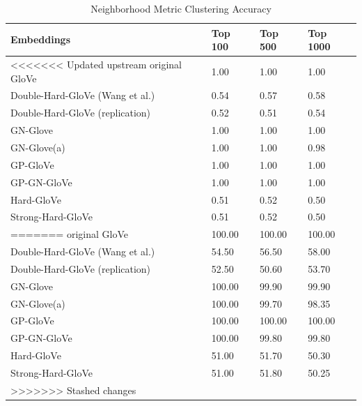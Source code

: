 \documentclass[
  english,
  man,floatsintext]{apa6}
\begin{document}
\begin{table}[tbp]

\begin{center}
\begin{threeparttable}

\caption{\label{tab:table 2}Neighborhood Metric Clustering Accuracy}

\begin{tabular}{llll}
\toprule
Embeddings & Top 100 & Top 500 & Top 1000\\
\midrule
<<<<<<< Updated upstream
original GloVe & 1.00 & 1.00 & 1.00\\
Double-Hard-GloVe (Wang et al.) & 0.54 & 0.57 & 0.58\\
Double-Hard-GloVe (replication) & 0.52 & 0.51 & 0.54\\
GN-Glove & 1.00 & 1.00 & 1.00\\
GN-Glove(a) & 1.00 & 1.00 & 0.98\\
GP-GloVe & 1.00 & 1.00 & 1.00\\
GP-GN-GloVe & 1.00 & 1.00 & 1.00\\
Hard-GloVe & 0.51 & 0.52 & 0.50\\
Strong-Hard-GloVe & 0.51 & 0.52 & 0.50\\
=======
original GloVe & 100.00 & 100.00 & 100.00\\
Double-Hard-GloVe (Wang et al.) & 54.50 & 56.50 & 58.00\\
Double-Hard-GloVe (replication) & 52.50 & 50.60 & 53.70\\
GN-Glove & 100.00 & 99.90 & 99.90\\
GN-Glove(a) & 100.00 & 99.70 & 98.35\\
GP-GloVe & 100.00 & 100.00 & 100.00\\
GP-GN-GloVe & 100.00 & 99.80 & 99.80\\
Hard-GloVe & 51.00 & 51.70 & 50.30\\
Strong-Hard-GloVe & 51.00 & 51.80 & 50.25\\
>>>>>>> Stashed changes
\bottomrule
\end{tabular}

\end{threeparttable}
\end{center}

\end{table}
\end{document}
